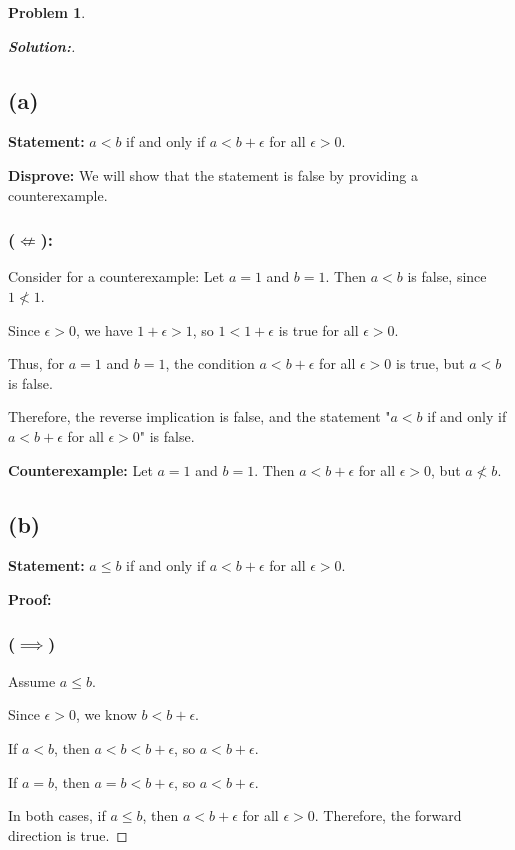 \documentclass[12pt]{article}
\theoremstyle{definition}\newtheorem{problem}{Problem}
\newenvironment{solution}{\begin{proof}[\bfseries\textup{Solution:}]}{\end{proof}}
\begin{document}
\newpage
\begin{problem}
\end{problem}
\begin{solution}
    
\subsection*{(a)}
\textbf{Statement:} $a<b$ if and only if $a<b+\epsilon$ for all $\epsilon>0$.

\textbf{Disprove:} We will show that the statement is false by providing a counterexample.


\subsubsection*{($\not\Longleftarrow$):}
Consider for a counterexample: 
Let $a = 1$ and $b = 1$. Then $a < b$ is false, since $1 \not< 1$.

Since $\epsilon > 0$, we have $1 + \epsilon > 1$, so $1 < 1 + \epsilon$ is true for all $\epsilon > 0$.

Thus, for $a=1$ and $b=1$, the condition $a<b+\epsilon$ for all $\epsilon>0$ is true, but $a<b$ is false.

Therefore, the reverse implication is false, and the statement "$a<b$ if and only if $a<b+\epsilon$ for all $\epsilon>0$" is false.

\textbf{Counterexample:} Let $a=1$ and $b=1$. Then $a < b + \epsilon$ for all $\epsilon > 0$, but $a \not< b$.


\subsection*{(b)}
\textbf{Statement:} $a \le b$ if and only if $a<b+\epsilon$ for all $\epsilon>0$.


\textbf{Proof:}

\subsubsection*{($\implies$)}
Assume $a \le b$.

Since $\epsilon>0$, we know $b < b+\epsilon$.

If $a < b$, then $a < b < b+\epsilon$, so $a < b+\epsilon$.

If $a = b$, then $a = b < b+\epsilon$, so $a < b+\epsilon$.

In both cases, if $a \le b$, then $a < b+\epsilon$ for all $\epsilon>0$. Therefore, the forward direction is true.


\end{solution}
\end{document}
